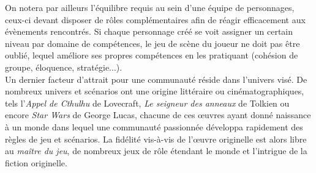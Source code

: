 On notera par ailleurs l'équilibre requis au sein d'une équipe de personnages, ceux-ci devant disposer de rôles complémentaires afin de réagir efficacement aux évènements rencontrés. Si chaque personnage créé se voit assigner un certain niveau par domaine de compétences, le jeu de scène du joueur ne doit pas être oublié, lequel améliore ses propres compétences en les pratiquant (cohésion de groupe, éloquence, stratégie...).\\


Un dernier facteur d'attrait pour une communauté réside dans l'univers visé. De nombreux univers et scénarios ont une origine littéraire ou cinématographiques, tels l'\textit{Appel de Cthulhu} de Lovecraft, \textit{Le seigneur des anneaux} de Tolkien ou encore \textit{Star Wars} de George Lucas, chacune de ces \oe uvres ayant donné naissance à un monde dans lequel une communauté passionnée développa rapidement des règles de jeu et scénarios. La fidélité vis-à-vis de l'\oe uvre originelle est alors libre au \textit{maître du jeu}, de nombreux jeux de rôle étendant le monde et l'intrigue de la fiction originelle.

\clearpage
